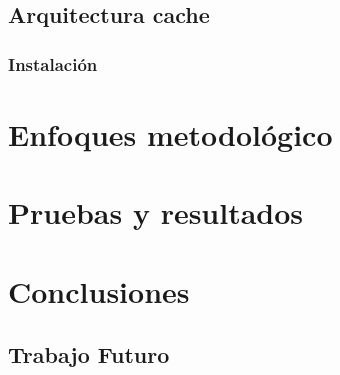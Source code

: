\documentclass[12pt]{ociamthesis}  %
\begin{document}
\section{Arquitectura cache}
\subsection{Instalación}


\chapter{Enfoques metodológico}

\chapter{Pruebas y resultados}

\chapter{Conclusiones}
\section{Trabajo Futuro}


\end{document}
